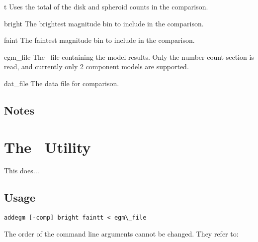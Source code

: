 \documentclass[11pt,twoside]{article}
\begin{document}
\begin{clo}{t}
Uses the total of the disk and spheroid counts in the comparison.
\end{clo}

\begin{clo}{bright}
The brightest magnitude bin to include in the comparison.
\end{clo}

\begin{clo}{faint}
The faintest magnitude bin to include in the comparison.
\end{clo}

\begin{clo}{egm\_file}
The \egm\ file containing the model results. Only the number count section is
read, and currently only 2 component models are supported.
\end{clo}

\begin{clo}{dat\_file}
The data file for comparison. 
\end{clo}

\subsection*{Notes}



\newpage
\section{The \addegm\ Utility}

This does...

\subsection*{Usage}

\begin{verbatim}
addegm [-comp] bright faintt < egm\_file
\end{verbatim}

\nin
The order of the command line arguments cannot be changed. They refer to:
\medskip
\end{document}

